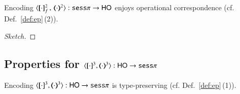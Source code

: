 \begin{proposition}\rm
	\label{app:enc_sesp_to_HO_oc}
	Encoding $\fencod{\cdot}{\cdot}{2}{f}: \sessp \to \HO$ 
	enjoys operational correspondence (cf. Def.~\ref{def:ep}\,(2)).
\end{proposition}

\begin{proof}[Sketch]
\end{proof}



\subsection{Properties for $\encod{\cdot}{\cdot}{3}: \HO \to \sessp$}
\label{app:enc_HO_to_sessp}

\begin{proposition}\rm
	\label{app:enc_HO_to_sessp_t}
	Encoding $\encod{\cdot}{\cdot}{3}: \HO \to \sessp$  is type-preserving (cf. Def.~\ref{def:ep}\,(1)).
\end{proposition}

